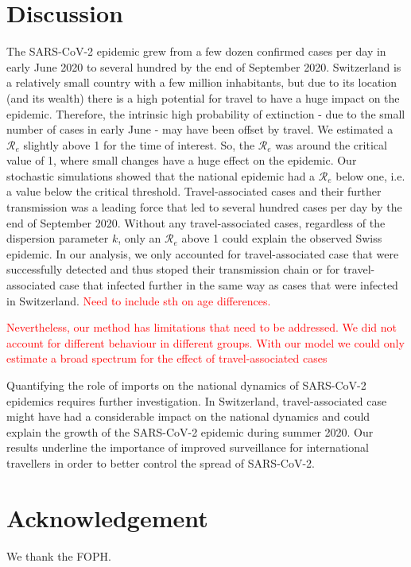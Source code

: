 \documentclass[10pt, a4paper, twoside]{article}
\begin{document}
\begin{multicols}{2}

\section{Discussion}
The SARS-CoV-2 epidemic grew from a few dozen confirmed cases per day in early June 2020 to several hundred by the end of September 2020. 
Switzerland is a relatively small country with a few million inhabitants, but due to its location (and its wealth) there is a high potential for travel to have a huge impact on the epidemic.
Therefore, the intrinsic high probability of extinction - due to the small number of cases in early June - may have been offset by travel.
We estimated a $\mathcal{R}_e$ slightly above 1 for the time of interest. So, the $\mathcal{R}_e$ was around the critical value of 1, where small changes have a huge effect on the epidemic. 
Our stochastic simulations showed that the national epidemic had a $\mathcal{R}_e$ below one, i.e. a value below the critical threshold. 
Travel-associated cases and their further transmission was a leading force that led to several hundred cases per day by the end of September 2020. 
Without any travel-associated cases, regardless of the dispersion parameter $k$, only an $\mathcal{R}_e$ above 1 could explain the observed Swiss epidemic. 
In our analysis, we only accounted for travel-associated case that were successfully detected and thus stoped their transmission chain or for travel-associated case that infected further in the same way as cases that were infected in Switzerland.
\textcolor{red}{Need to include sth on age differences.}


\textcolor{red}{Nevertheless, our method has limitations that need to be addressed. We did not account for different behaviour in different groups. With our model we could only estimate a broad spectrum for the effect of travel-associated cases}

Quantifying the role of imports on the national dynamics of SARS-CoV-2 epidemics requires further investigation. 
In Switzerland, travel-associated case might have had a considerable impact on the national dynamics and could explain the growth of the SARS-CoV-2 epidemic during summer 2020. 
Our results underline the importance of improved surveillance for international travellers in order to better control the spread of SARS-CoV-2.

\section{Acknowledgement}
We thank the FOPH.


\end{multicols}
\end{document}
